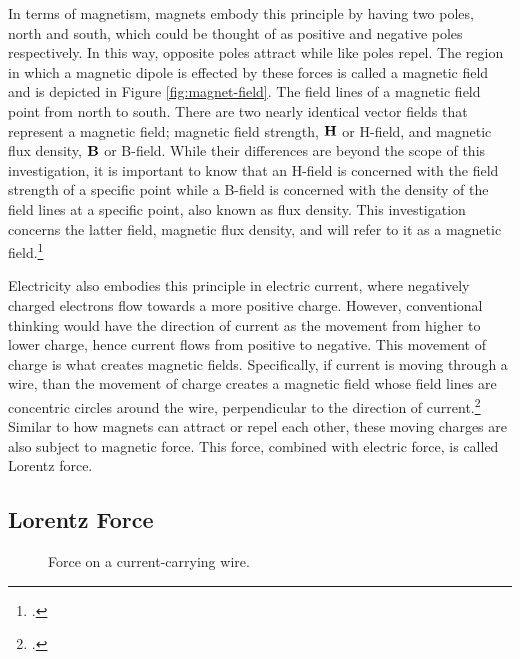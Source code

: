 In terms of magnetism, magnets embody this principle by having two poles, north and south, which could be thought of as positive and negative poles respectively.
In this way, opposite poles attract while like poles repel.
The region in which a magnetic dipole is effected by these forces is called a magnetic field and is depicted in Figure \ref{fig:magnet-field}.
The field lines of a magnetic field point from north to south.
There are two nearly identical vector fields that represent a magnetic field; magnetic field strength, $\bm{\mathbf{H}}$ or H-field, and magnetic flux density, $\bm{\mathbf{B}}$ or B-field.
While their differences are beyond the scope of this investigation, it is important to know that an H-field is concerned with the field strength of a specific point while a B-field is concerned with the density of the field lines at a specific point, also known as flux density.
This investigation concerns the latter field, magnetic flux density, and will refer to it as a magnetic field.\footcite{britfields}

Electricity also embodies this principle in electric current, where negatively charged electrons flow towards a more positive charge.
However, conventional thinking would have the direction of current as the movement from higher to lower charge, hence current flows from positive to negative.
This movement of charge is what creates magnetic fields.
Specifically, if current is moving through a wire, than the movement of charge creates a magnetic field whose field lines are concentric circles around the wire, perpendicular to the direction of current.\footcite{msufields}
Similar to how magnets can attract or repel each other, these moving charges are also subject to magnetic force.
This force, combined with electric force, is called Lorentz force.

\subsection*{Lorentz Force}

\begin{figure}
	\centering
	\caption{Force on a current-carrying wire.}
	\label{fig:laplace-force}
\end{figure}

